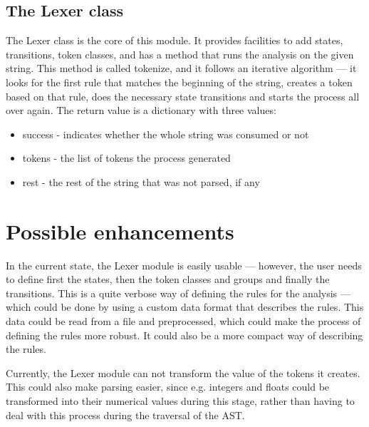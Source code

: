 \subsection{The Lexer class}
The Lexer class is the core of this module. It provides facilities to add states, transitions, token classes, and has a method that runs the analysis on the given string. This method is called tokenize, and it follows an iterative algorithm --- it looks for the first rule that matches the beginning of the string, creates a token based on that rule, does the necessary state transitions and starts the process all over again. The return value is a dictionary with three values:
\begin{itemize}
\item success - indicates whether the whole string was consumed or not
\item tokens - the list of tokens the process generated
\item rest - the rest of the string that was not parsed, if any
\end{itemize}
\section{Possible enhancements}
In the current state, the Lexer module is easily usable --- however, the user needs to define first the states, then the token classes and groups and finally the transitions. This is a quite verbose way of defining the rules for the analysis --- which could be done by using a custom data format that describes the rules. This data could be read from a file and preprocessed, which could make the process of defining the rules more robust. It could also be a more compact way of describing the rules.

Currently, the Lexer module can not transform the value of the tokens it creates. This could also make parsing easier, since e.g. integers and floats could be transformed into their numerical values during this stage, rather than having to deal with this process during the traversal of the AST.